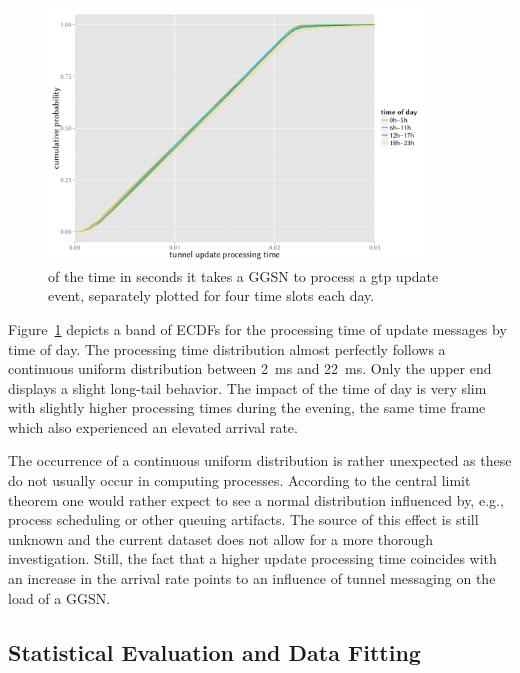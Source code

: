 \begin{figure}[htb]
	\centering
	\includegraphics[width=0.9\textwidth]{images/R-update-time-cdfs.pdf}
	\caption{ of the time in seconds it takes a \acrshort{GGSN} to process a \acrshort{gtp} update event, separately plotted for four time slots each day.}
	\label{c4:fig:update-time}
\end{figure}

Figure~\ref{c4:fig:update-time} depicts a band of \glspl{ECDF} for the processing time of update messages by time of day. The processing time distribution almost perfectly follows a continuous uniform distribution between \SI{2}{\milli\second} and \SI{22}{\milli\second}. Only the upper end displays a slight long-tail behavior. The impact of the time of day is very slim with slightly higher processing times during the evening, the same time frame which also experienced an elevated arrival rate.

The occurrence of a continuous uniform distribution is rather unexpected as these do not usually occur in computing processes. According to the central limit theorem one would rather expect to see a normal distribution influenced by, e.g., process scheduling or other queuing artifacts. The source of this effect is still unknown and the current dataset does not allow for a more thorough investigation. Still, the fact that a higher update processing time coincides with an increase in the arrival rate points to an influence of tunnel messaging on the load of a \gls{GGSN}.



\subsection{Statistical Evaluation and Data Fitting}
\label{c4:sec:statistical_evaluation}

